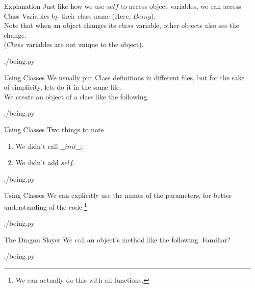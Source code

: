 \documentclass{beamer}
\begin{document}
\begin{frame}{Explanation}
  Just like how we use $self$ to access object variables, we can access Class
  Variables by their class name (Here, $Being$).\\
  Note that when an object changes its $class$ variable, other objects also see
  the change.\\($Class$ variables are not unique to the object).
  \begin{lstinputlisting}[firstline=20, lastline=22]
    {./being.py}
  \end{lstinputlisting}
\end{frame}


\begin{frame}{Using Classes}
  We usually put Class definitions in different files, but for the sake of
  simplicity, lets do it in the same file.\\
  We create an object of a class like the following.
  \begin{lstinputlisting}[firstline=25, lastline=27]
    {./being.py}
  \end{lstinputlisting}
\end{frame}

\begin{frame}{Using Classes}
  Two things to note
  \begin{enumerate}
    \item We didn't call $\_\_init\_\_$.
    \item We didn't add $self$.
  \end{enumerate}
  \begin{lstinputlisting}[firstline=25, lastline=25]
    {./being.py}
  \end{lstinputlisting}
\end{frame}

\begin{frame}{Using Classes}
  We can explicitly use the names of the parameters, for better understanding of the
  code.\footnote{We can actually do this with all functions.}
  \begin{lstinputlisting}[firstline=26, lastline=27]
    {./being.py}
  \end{lstinputlisting}
\end{frame}

\begin{frame}{The Dragon Slayer}
  We call an object's method like the following. Familiar?
  \begin{lstinputlisting}[firstline=29, lastline=29]
    {./being.py}
  \end{lstinputlisting}
\end{frame}
\end{document}
